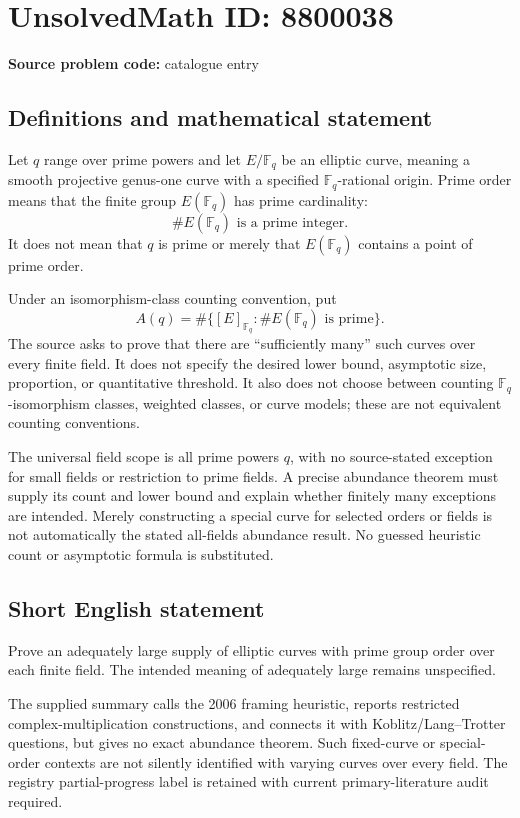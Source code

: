 \documentclass[11pt]{article}
\newcommand{\F}{\mathbb{F}}
\begin{document}
\section*{UnsolvedMath ID: 8800038}
\textbf{Source problem code:} catalogue entry
\subsection{Definitions and mathematical statement}
Let $q$ range over prime powers and let $E/\F_q$ be an elliptic curve, meaning a smooth projective genus-one curve with a specified $\F_q$-rational origin. Prime order means that the finite group $E(\F_q)$ has prime cardinality:
\[
 \#E(\F_q)\text{ is a prime integer}.
\]
It does not mean that $q$ is prime or merely that $E(\F_q)$ contains a point of prime order.

Under an isomorphism-class counting convention, put
\[
 A(q)=\#\{[E]_{\F_q}:\#E(\F_q)\text{ is prime}\}.
\]
The source asks to prove that there are ``sufficiently many'' such curves over every finite field. It does not specify the desired lower bound, asymptotic size, proportion, or quantitative threshold. It also does not choose between counting $\F_q$-isomorphism classes, weighted classes, or curve models; these are not equivalent counting conventions.

The universal field scope is all prime powers $q$, with no source-stated exception for small fields or restriction to prime fields. A precise abundance theorem must supply its count and lower bound and explain whether finitely many exceptions are intended. Merely constructing a special curve for selected orders or fields is not automatically the stated all-fields abundance result. No guessed heuristic count or asymptotic formula is substituted.
\subsection{Short English statement}
Prove an adequately large supply of elliptic curves with prime group order over each finite field. The intended meaning of adequately large remains unspecified.

The supplied summary calls the 2006 framing heuristic, reports restricted complex-multiplication constructions, and connects it with Koblitz/Lang--Trotter questions, but gives no exact abundance theorem. Such fixed-curve or special-order contexts are not silently identified with varying curves over every field. The registry partial-progress label is retained with current primary-literature audit required.
\end{document}
